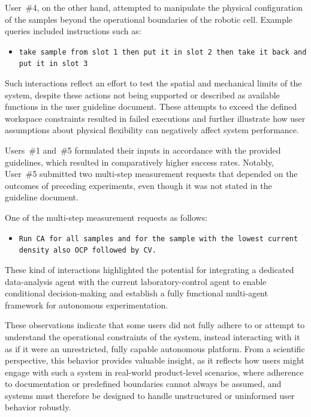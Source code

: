 User~\#4, on the other hand, attempted to manipulate the physical configuration of the samples beyond the operational boundaries of the robotic cell. Example queries included instructions such as:

\begin{itemize}
    \item \texttt{take sample from slot 1 then put it in slot 2 then take it back and put it in slot 3}
\end{itemize}

Such interactions reflect an effort to test the spatial and mechanical limits of the system, despite these actions not being supported or described as available functions in the user guideline document. These attempts to exceed the defined workspace constraints resulted in failed executions and further illustrate how user assumptions about physical flexibility can negatively affect system performance.

Users~\#1 and~\#5 formulated their inputs in accordance with the provided guidelines, which resulted in comparatively higher success rates. Notably, User~\#5 submitted two multi-step measurement requests that depended on the outcomes of preceding experiments, even though it was not stated in the guideline document.

One of the multi-step measurement requests as follows:
\begin{itemize}
    \item \texttt{Run CA for all samples and for the sample with the lowest current density also OCP followed by CV.}
\end{itemize}

These kind of interactions highlighted the potential for integrating a dedicated data-analysis agent with the current laboratory-control agent to enable conditional decision-making and establish a fully functional multi-agent framework for autonomous experimentation.

These observations indicate that some users did not fully adhere to or attempt to understand the operational constraints of the system, instead interacting with it as if it were an unrestricted, fully capable autonomous platform. From a scientific perspective, this behavior provides valuable insight, as it reflects how users might engage with such a system in real-world product-level scenarios, where adherence to documentation or predefined boundaries cannot always be assumed, and systems must therefore be designed to handle unstructured or uninformed user behavior robustly.

